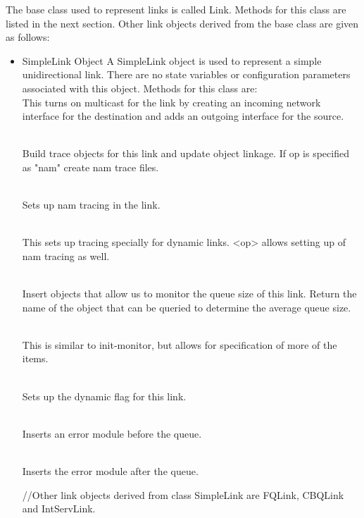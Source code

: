 The base class used to represent links is called Link. Methods for
this class are listed in the next section. Other link objects derived from
the base class are given as follows:

\begin{itemize}

\item SimpleLink Object
A SimpleLink object is used to represent a simple unidirectional link.
There are no state variables or configuration parameters associated with
this object. Methods for this class are:
\\
This turns on multicast for the link by creating an incoming network
interface for the destination and adds an outgoing interface for the
source.

\\
Build trace objects for this link and update object linkage. If op is
specified as "nam" create nam trace files.

\\
Sets up nam tracing in the link.

\\
This sets up tracing specially for dynamic links. <op> allows setting up
of nam tracing as well.

\\
Insert objects that allow us to monitor the queue size of this link.
Return the name of the object that can be queried to determine the average
queue size.

\\
This is similar to init-monitor, but allows for specification of more of
the items.

\\
Sets up the dynamic flag for this link.

\\
Inserts an error module before the queue.

\\
Inserts the error module after the queue.

//Other link objects derived from class SimpleLink are FQLink,
CBQLink and IntServLink.


\end{itemize}
